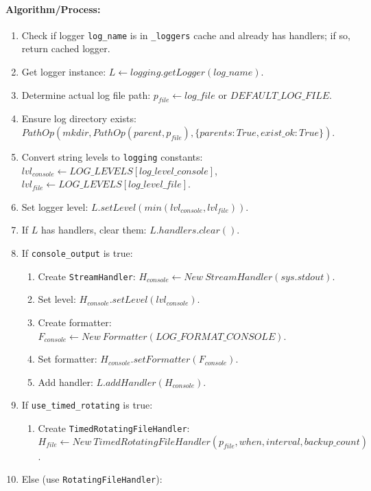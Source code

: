 \documentclass{article}
\begin{document}
\paragraph{Algorithm/Process:}
\begin{enumerate}
    \item Check if logger \texttt{log\_name} is in \texttt{\_loggers} cache and already has handlers; if so, return cached logger.
    \item Get logger instance: $L \leftarrow logging.getLogger(log\_name)$.
    \item Determine actual log file path: $p_{file} \leftarrow log\_file \text{ or } DEFAULT\_LOG\_FILE$.
    \item Ensure log directory exists: $PathOp(mkdir, PathOp(parent, p_{file}), \{parents: True, exist\_ok: True\})$.
    \item Convert string levels to \texttt{logging} constants: $lvl_{console} \leftarrow LOG\_LEVELS[log\_level\_console]$, $lvl_{file} \leftarrow LOG\_LEVELS[log\_level\_file]$.
    \item Set logger level: $L.setLevel(min(lvl_{console}, lvl_{file}))$.
    \item If $L$ has handlers, clear them: $L.handlers.clear()$.
    \item If \texttt{console\_output} is true:
    \begin{enumerate}
        \item Create \texttt{StreamHandler}: $H_{console} \leftarrow New \ StreamHandler(sys.stdout)$.
        \item Set level: $H_{console}.setLevel(lvl_{console})$.
        \item Create formatter: $F_{console} \leftarrow New \ Formatter(LOG\_FORMAT\_CONSOLE)$.
        \item Set formatter: $H_{console}.setFormatter(F_{console})$.
        \item Add handler: $L.addHandler(H_{console})$.
    \end{enumerate}
    \item If \texttt{use\_timed\_rotating} is true:
    \begin{enumerate}
        \item Create \texttt{TimedRotatingFileHandler}: $H_{file} \leftarrow New \ TimedRotatingFileHandler(p_{file}, when, interval, backup\_count)$.
    \end{enumerate}
    \item Else (use \texttt{RotatingFileHandler}):
    \begin{enumerate}

\end{enumerate}
\end{enumerate}
\end{document}
